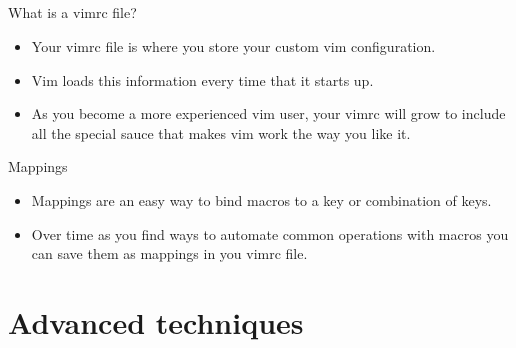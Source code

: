 \documentclass{beamer}
\begin{document}
    \subsection{}
    \begin{frame}{What is a vimrc file?}
        \begin{itemize}
            \item Your vimrc file is where you store your custom vim configuration.
            \item Vim loads this information every time that it starts up.
            \item As you become a more experienced vim user, your vimrc will grow to include all the special sauce that makes vim work the way you like it.
        \end{itemize}
    \end{frame}
    \begin{frame}{Mappings}
        \begin{itemize}
            \item Mappings are an easy way to bind macros to a key or combination of keys.
            \item Over time as you find ways to automate common operations with macros you can save them as mappings in you vimrc file.
        \end{itemize}
    \end{frame}
    \section{Advanced techniques}
\end{document}
